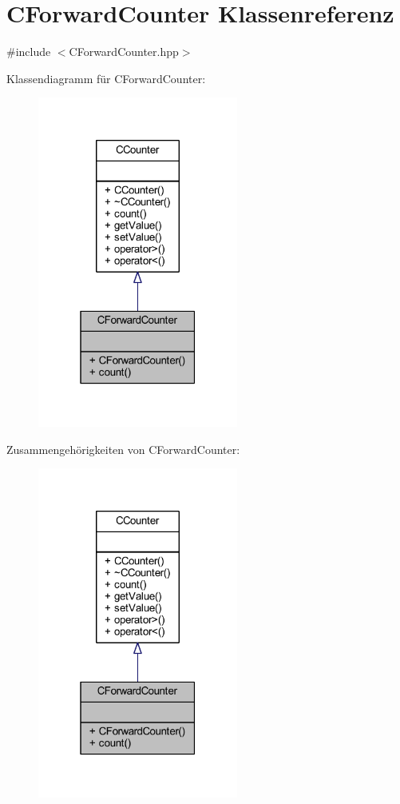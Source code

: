 \hypertarget{class_c_forward_counter}{}\section{C\+Forward\+Counter Klassenreferenz}
\label{class_c_forward_counter}


{\ttfamily \#include $<$C\+Forward\+Counter.\+hpp$>$}



Klassendiagramm für C\+Forward\+Counter\+:
\nopagebreak
\begin{figure}[H]
\begin{center}
\leavevmode
\includegraphics[width=187pt]{class_c_forward_counter__inherit__graph}
\end{center}
\end{figure}


Zusammengehörigkeiten von C\+Forward\+Counter\+:
\nopagebreak
\begin{figure}[H]
\begin{center}
\leavevmode
\includegraphics[width=187pt]{class_c_forward_counter__coll__graph}
\end{center}
\end{figure}
